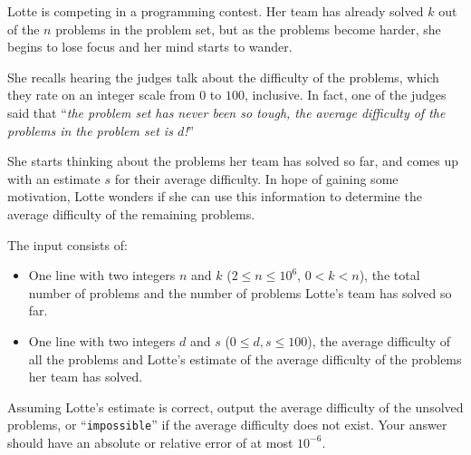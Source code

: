 
\providecommand{\maxn}{}
\renewcommand{\maxn}{10^6}

%
Lotte is competing in a programming contest. Her team has already solved $k$
out of the $n$ problems in the problem set, but as the problems become harder,
she begins to lose focus and her mind starts to wander.

She recalls hearing the judges talk about the difficulty of the problems, which
they rate on an integer scale from $0$ to $100$, inclusive. In fact, one of the
judges said that ``\textit{the problem set has never been so tough, the average
difficulty of the problems in the problem set is $d$!}''

She starts thinking about the problems her team has solved so far, and comes up
with an estimate $s$ for their average difficulty. In hope of gaining some
motivation, Lotte wonders if she can use this information to determine the
average difficulty of the remaining problems.

\begin{Input}
	The input consists of:
	\begin{itemize}
        \item One line with two integers $n$ and $k$ ($2\leq n\leq \maxn$, $0 < k < n$), the total number of
			problems and the number of problems Lotte's team has solved so far.
        \item One line with two integers $d$ and $s$ ($0\leq d,s \leq 100$), the
            average difficulty of all the problems and Lotte's estimate of the
            average difficulty of the problems her team has solved.
	\end{itemize}
\end{Input}

\begin{Output}
    Assuming Lotte's estimate is correct, output the average difficulty of the
    unsolved problems, or ``\texttt{impossible}'' if the average difficulty
    does not exist. Your answer should have an absolute or relative error of at
    most $10^{-6}$.
\end{Output}
